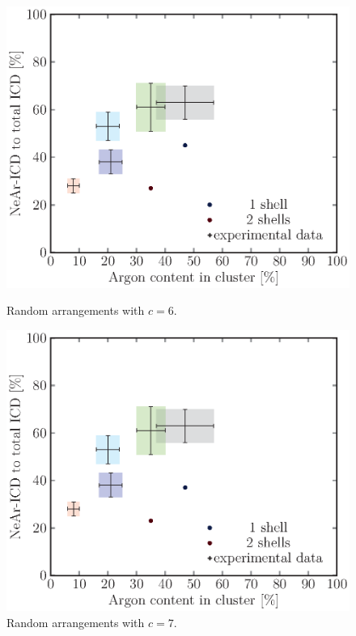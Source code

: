 \begin{figure}[!h]
\begin{minipage}{0.48\textwidth}
    \centering
    \includegraphics[scale=0.5]{pics/random06.ps}
    \caption{Random arrangements with $c=6$.}
    \label{random06}
\end{minipage}
\hfill
\begin{minipage}{0.48\textwidth}
    \centering
    \includegraphics[scale=0.5]{pics/random07.ps}
    \caption{Random arrangements with $c=7$.}
    \label{random07}
\end{minipage}
\end{figure}

